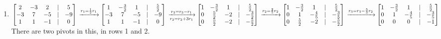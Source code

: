 \documentclass{article}
\begin{document}
\begin{enumerate}
	\item $
	\begin{bmatrix}
		2	&-3	&2	&|	&5\\
		-3	&7	&-5	&|	&-9\\
		1	&1	&-1	&|	&0
	\end{bmatrix}\\
	\xrightarrow[]{r_1=\frac{1}{2}r_1}
	\begin{bmatrix}
		1	&-\frac{3}{2}	&1	&|	&\frac{5}{2}\\
		-3	&7	&-5	&|	&-9\\
		1	&1	&-1	&|	&0
	\end{bmatrix}\\
	\xrightarrow[r_2 = r_2+3r_1]{r_3=r_3-r_1}
	\begin{bmatrix}
		1	&-\frac{3}{2}	&1	&|	&\frac{5}{2}\\
		0	&\frac{5}{2}	&-2	&|	&-\frac{3}{2}\\
		0	&\frac{5}{2}	&-2	&|	&-\frac{5}{2}
	\end{bmatrix}\\
	\xrightarrow[]{r_2=\frac{2}{5}r_2}
	\begin{bmatrix}
		1	&-\frac{3}{2}	&1	&|	&\frac{5}{2}\\
		0	&1	&-\frac{4}{5}	&|	&-\frac{3}{5}\\
		0	&\frac{5}{2}	&-2	&|	&-\frac{5}{2}
	\end{bmatrix}\\
	\xrightarrow[]{r_3=r_3-\frac{5}{3}r_2}
	\begin{bmatrix}
		1	&-\frac{3}{2}	&1	&|	&\frac{5}{2}\\
		0	&1	&-\frac{4}{5}	&|	&-\frac{3}{5}\\
		0	&0	&0	&|	&-1
	\end{bmatrix}
	$\\
	There are two pivots in this, in rows 1 and 2. 
	

\end{enumerate}
\end{document}
